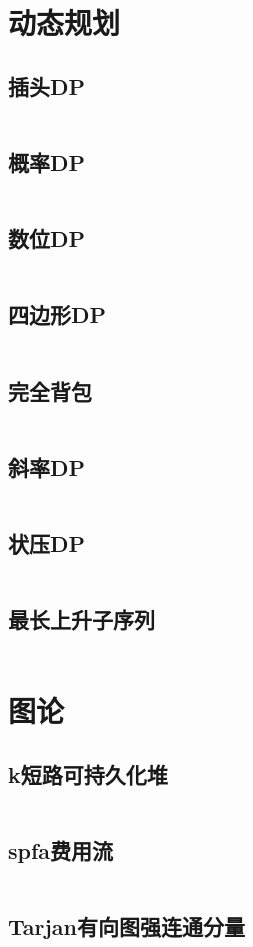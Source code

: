 \documentclass[UTF8]{ctexart}
\begin{document}
\section{动态规划}
\subsection{插头DP}
\inputminted{cpp}{dp/插头dp.cpp}
\subsection{概率DP}
\inputminted{cpp}{dp/概率dp.cpp}
\subsection{数位DP}
\inputminted{cpp}{dp/数位dp.cpp}
\subsection{四边形DP}
\inputminted{cpp}{dp/四边形dp.cpp}
\subsection{完全背包}
\inputminted{cpp}{dp/完全背包.cpp}
\subsection{斜率DP}
\inputminted{cpp}{dp/斜率dp.cpp}
\subsection{状压DP}
\inputminted{cpp}{dp/状压dp.cpp}
\subsection{最长上升子序列}
\inputminted{cpp}{dp/最长上升子序列.cpp}
\section{图论}
\subsection{k短路可持久化堆}
\inputminted{cpp}{graphtheory/k短路可持久化堆.cpp}
\subsection{spfa费用流}
\inputminted{cpp}{graphtheory/spfa费用流.cpp}
\subsection{Tarjan有向图强连通分量}
\inputminted{cpp}{graphtheory/Tarjan有向图强连通分量.cpp}
\end{document}
